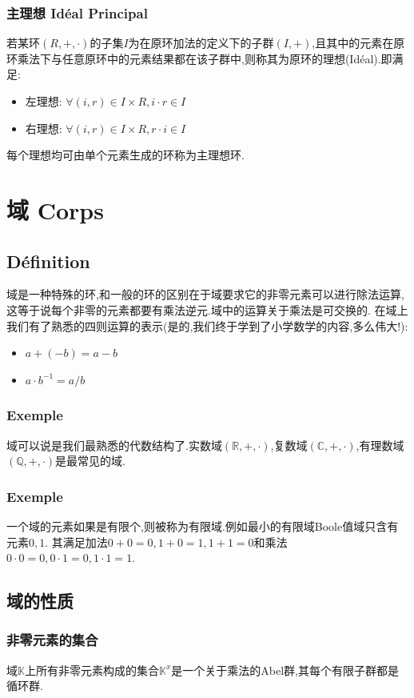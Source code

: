 \documentclass[12pt, a4paper, oneside]{ctexbook}
\newcommand{\R }{\mathbb{R}}%
\begin{document}
  \subsubsection{主理想 Idéal Principal}
  若某环$(R,+,\cdot)$的子集$I$为在原环加法的定义下的子群$(I,+)$,且其中的元素在原环乘法下与任意原环中的元素结果都在该子群中,则称其为原环的理想(Idéal).即满足:
  \begin{itemize}
    \item 左理想: $\forall (i,r)\in I\times R,i\cdot r\in I$
    \item 右理想: $\forall (i,r)\in I\times R,r\cdot i\in I$
  \end{itemize}
  每个理想均可由单个元素生成的环称为主理想环.\\


  \section{域 Corps}
  \subsection{Définition}
  域是一种特殊的环,和一般的环的区别在于域要求它的非零元素可以进行除法运算,这等于说每个非零的元素都要有乘法逆元.域中的运算关于乘法是可交换的.
  在域上我们有了熟悉的四则运算的表示(是的,我们终于学到了小学数学的内容,多么伟大!):
  \begin{itemize}
    \item $  a+(-b)=a-b $
    \item $ a\cdot b^{-1}=a/b$
  \end{itemize}
  \subsubsection{Exemple}
  域可以说是我们最熟悉的代数结构了.实数域$(\R,+,\cdot)$,复数域$(\mathbb{C},+,\cdot)$,有理数域$(\mathbb{Q},+,\cdot)$是最常见的域.
  \subsubsection{Exemple}
  一个域的元素如果是有限个,则被称为有限域.例如最小的有限域Boole值域只含有元素$0,1$.
  其满足加法$0+0=0,1+0=1,1+1=0$和乘法$0\cdot 0=0,0\cdot 1=0,1\cdot 1=1$.
  \subsection{域的性质}
  \subsubsection{非零元素的集合}
  域$\mathbb{K}$上所有非零元素构成的集合$\mathbb{K}^x$是一个关于乘法的Abel群,其每个有限子群都是循环群.
\end{document}
